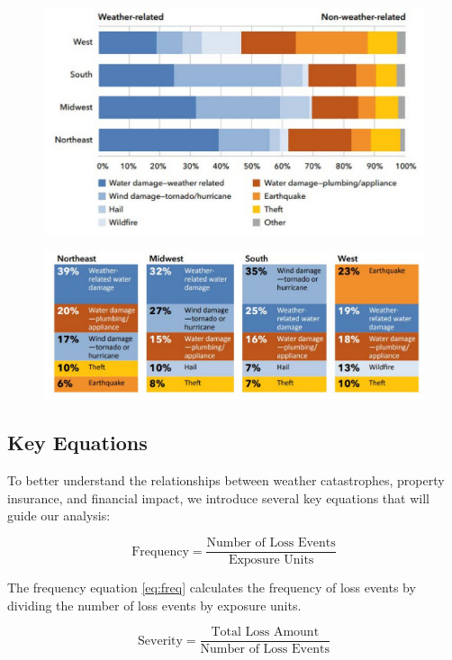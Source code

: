 \documentclass[12pt]{article}
\begin{document}
\begin{figure}[ht]
    \centering
    \includegraphics[width=0.8\linewidth]{NAIC HO threats.pdf}
    \caption{}
    \label{fig:disaster_threats}
\end{figure}

\begin{figure}[ht]
    \centering
    \includegraphics[width=0.8\linewidth]{NAIC Property Threat by Regions.pdf}
    \caption{}
    \label{fig:regional_disasters}
\end{figure}


    
\subsection{Key Equations}

To better understand the relationships between weather catastrophes, property insurance, and financial impact, we introduce several 
key equations that will guide our analysis:

\begin{equation}
    \label{eq:freq}
    \text{Frequency} = \frac{\text{Number of Loss Events}}{\text{Exposure Units}}
\end{equation}

The frequency equation \ref{eq:freq} calculates the frequency of loss events by dividing the number of loss events by exposure units.

\begin{equation}
    \label{eq:sev}
    \text{Severity} = \frac{\text{Total Loss Amount}}{\text{Number of Loss Events}}
\end{equation}
\end{document}

